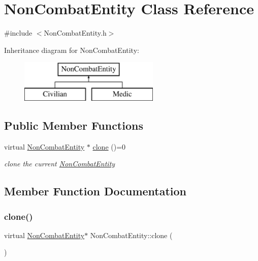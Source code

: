 \hypertarget{class_non_combat_entity}{}\section{Non\+Combat\+Entity Class Reference}
\label{class_non_combat_entity}


{\ttfamily \#include $<$Non\+Combat\+Entity.\+h$>$}

Inheritance diagram for Non\+Combat\+Entity\+:\begin{figure}[H]
\begin{center}
\leavevmode
\includegraphics[height=2.000000cm]{class_non_combat_entity}
\end{center}
\end{figure}
\subsection*{Public Member Functions}
\begin{DoxyCompactItemize}
\item 
virtual \mbox{\hyperlink{class_non_combat_entity}{Non\+Combat\+Entity}} $\ast$ \mbox{\hyperlink{class_non_combat_entity_a4d6e9ad6c7682a10e2e491cac30fd0c0}{clone}} ()=0
\begin{DoxyCompactList}\small\item\em clone the current \mbox{\hyperlink{class_non_combat_entity}{Non\+Combat\+Entity}} \end{DoxyCompactList}\end{DoxyCompactItemize}


\subsection{Member Function Documentation}
\mbox{\label{class_non_combat_entity_a4d6e9ad6c7682a10e2e491cac30fd0c0}} 
\subsubsection{\texorpdfstring{clone()}{clone()}}
{\footnotesize\ttfamily virtual \mbox{\hyperlink{class_non_combat_entity}{Non\+Combat\+Entity}}$\ast$ Non\+Combat\+Entity\+::clone (\begin{DoxyParamCaption}{ }\end{DoxyParamCaption})\hspace{0.3cm}{\ttfamily [pure virtual]}}



